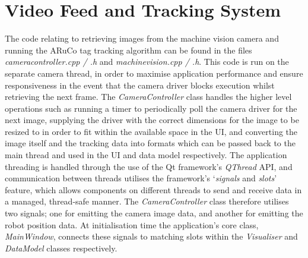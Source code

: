 
\section{Video Feed and Tracking System} \label{VideoFeedAndTrackingSystem}
The code relating to retrieving images from the machine vision camera and running the ARuCo tag tracking algorithm can be found in the files \textit{cameracontroller.cpp / .h} and \textit{machinevision.cpp / .h}. This code is run on the separate camera thread, in order to maximise application performance and ensure responsiveness in the event that the camera driver blocks execution whilst retrieving the next frame. The \textit{CameraController} class handles the higher level operations such as running a timer to periodically poll the camera driver for the next image, supplying the driver with the correct dimensions for the image to be resized to in order to fit within the available space in the UI, and converting the image itself and the tracking data into formats which can be passed back to the main thread and used in the UI and data model respectively. The application threading is handled through the use of the Qt framework's \textit{QThread} API, and communication between threads utilises the framework's `\textit{signals} and \textit{slots}' feature, which allows components on different threads to send and receive data in a managed, thread-safe manner. The \textit{CameraController} class therefore utilises two signals; one for emitting the camera image data, and another for emitting the robot position data. At initialisation time the application's core class, \textit{MainWindow}, connects these signals to matching slots within the \textit{Visualiser} and \textit{DataModel} classes respectively.

